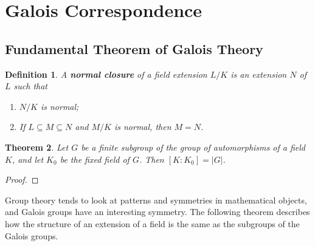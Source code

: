 \documentclass[12pt]{article}
\newtheorem{theorem}{Theorem}
\newtheorem{definition}[theorem]{Definition}
\begin{document}
\section{Galois Correspondence}
\subsection{Fundamental Theorem of Galois Theory}

\begin{definition}
    A \textbf{normal closure} of a field extension $L / K$ is an extension $N$ of $L$ such that 
    \begin{enumerate}
        \item $N / K$ is normal;
        \item If $L \subseteq M \subseteq N$ and $M / K$ is normal, then $M = N$.
    \end{enumerate}
\end{definition}

\begin{theorem}
    Let $G$ be a finite subgroup of the group of automorphisms of a field $K$, and let $K_0$ be the fixed field of $G$. Then $[K : K_0] = |G|$. 
\end{theorem}

\begin{proof}
    
\end{proof}

Group theory tends to look at patterns and symmetries in mathematical objects, and Galois groups have an interesting symmetry. The following theorem describes how the structure of an extension of a field is the same as the subgroups of the Galois groups.
\end{document}
